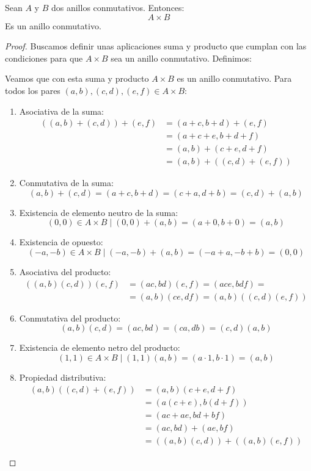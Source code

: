 \begin{prop}
    Sean $A$ y $B$ dos anillos conmutativos. Entonces:
    $$A \times B$$
    Es un anillo conmutativo.
\begin{proof}
    Buscamos definir unas aplicaciones suma y producto que cumplan con las condiciones para que $A \times B$ sea un anillo
    conmutativo. Definimos:
    
    Veamos que con esta suma y producto $A\times B$ es un anillo conmutativo. Para todos los pares $(a,b),(c,d),(e,f) \in A \times B$:
    \begin{enumerate}
    \item Asociativa de la suma:
    \begin{align*}
        ((a,b)+(c,d))+(e,f) &= (a+c,b+d)+(e,f) \\
        &= (a+c+e,b+d+f) \\
        &= (a,b) + (c+e,d+f) \\
        &= (a,b) + ((c,d)+(e,f))
    \end{align*}
    \item Conmutativa de la suma:
    $$(a,b)+(c,d) = (a+c,b+d) = (c+a,d+b) = (c,d)+(a,b)$$
    \item Existencia de elemento neutro de la suma:
    $$(0,0) \in A\times B \mid (0,0)+(a,b) = (a+0,b+0) = (a,b)$$
    \item Existencia de opuesto:
    $$(-a,-b) \in A\times B \mid (-a,-b)+(a,b) = (-a+a, -b+b) = (0,0)$$
    \item Asociativa del producto:
    \begin{align*}
        ((a,b)(c,d))(e,f) &= (ac,bd)(e,f) = (ace,bdf)
        =\\&= (a,b)(ce,df) = (a,b) ((c,d)(e,f))
    \end{align*}
    \item Conmutativa del producto:
    $$(a,b)(c,d) = (ac,bd) = (ca,db) = (c,d)(a,b)$$
    \item Existencia de elemento netro del producto:
    $$(1,1) \in A\times B \mid (1,1)(a,b) = (a\cdot 1, b\cdot 1) = (a,b)$$
    \item Propiedad distributiva:
    \begin{align*}
        (a,b)((c,d)+(e,f)) &= (a,b)(c+e,d+f) \\
        &= (a(c+e),b(d+f)) \\
        &= (ac+ae,bd+bf) \\
        &= (ac,bd) + (ae,bf) \\
        &= ((a,b)(c,d))+((a,b)(e,f))
    \end{align*}
    \end{enumerate}
\end{proof}
\end{prop}



